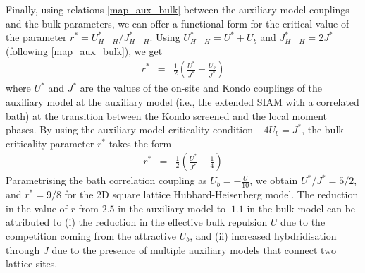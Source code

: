 \documentclass{report}
\numberwithin{equation}{section}
\begin{document}
\begin{itemize}
Finally, using relations \eqref{map_aux_bulk} between the auxiliary model couplings and the bulk parameters, we can offer a functional form for the critical value of the parameter $r^{*} = U_{H-H}^{*}/J_{H-H}^{*}$. Using \(U_{H-H}^{*} = U^* + U_b\) and \(J_{H-H}^{*} = 2J^*\) (following \eqref{map_aux_bulk}), we get
\begin{equation}\begin{aligned}
	r^{*} &=& \frac{1}{2}\left(\frac{U^{*}}{J^{*}} + \frac{U_b}{J^*}\right)
\end{aligned}\end{equation}
where $U^{*}$ and $J^{*}$ are the values of the on-site and Kondo couplings of the auxiliary model at the auxiliary model (i.e., the extended SIAM with a correlated bath) at the transition between the Kondo screened and the local moment phases. By using the auxiliary model criticality condition \(-4U_b = J^*\), the bulk criticality parameter \(r^*\) takes the form
\begin{equation}\begin{aligned}
	r^{*} &=& \frac{1}{2}\left(\frac{U^{*}}{J^{*}} - \frac{1}{4}\right)
\end{aligned}\end{equation}
Parametrising the bath correlation coupling as $U_{b}=-\frac{U}{10}$, we obtain $U^{*}/J^{*}=5/2$, and $r^{*} = 9/8$ for the 2D square lattice Hubbard-Heisenberg model. The reduction in the value of \(r\) from \(2.5\) in the auxiliary model to \(~1.1\) in the bulk model can be attributed to (i) the reduction in the effective bulk repulsion \(U\) due to the competition coming from the attractive \(U_b\), and (ii) increased hybdridisation through \(J\) due to the presence of multiple auxiliary models that connect two lattice sites.
\end{itemize}
\end{document}
